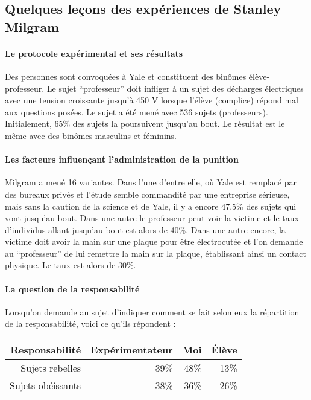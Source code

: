 \subsection{Quelques leçons des expériences de Stanley Milgram}

	\paragraph{Le protocole expérimental et ses résultats}

	Des personnes sont convoquées à Yale et constituent des binômes élève-professeur.
	Le sujet “professeur” doit infliger à un sujet des décharges électriques avec une tension croissante jusqu'à 450 V lorsque l'élève (complice) répond mal aux questions posées.
	Le sujet a été mené avec 536 sujets (professeurs).
	Initialement, 65\% des sujets la poursuivent jusqu'au bout.
	Le résultat est le même avec des binômes masculins et féminins.

	\paragraph{Les facteurs influençant l'administration de la punition}

	Milgram a mené 16 variantes.
	Dans l'une d'entre elle, où Yale est remplacé par des bureaux privés et l'étude semble commandité par une entreprise sérieuse, mais sans la caution de la science et de Yale, il y a encore 47,5\% des sujets qui vont jusqu'au bout.
	Dans une autre le professeur peut voir la victime et le taux d'individus allant jusqu'au bout est alors de 40\%.
	Dans une autre encore, la victime doit avoir la main sur une plaque pour être électrocutée et l'on demande au “professeur” de lui remettre la main sur la plaque, établissant ainsi un contact physique.
	Le taux est alors de 30\%.

	\paragraph{La question de la responsabilité}

	Lorsqu'on demande au sujet d'indiquer comment se fait selon eux la répartition de la responsabilité, voici ce qu'ils répondent :

	\vspace{0.3cm}
	\begin{tabular}{|r|rrr|}
	\hline
	Responsabilité & Expérimentateur & Moi & Élève \\
	\hline
	Sujets rebelles & 39\% & 48\% & 13\% \\
	\hline
	Sujets obéissants & 38\% & 36\% & 26\% \\
	\hline
	\end{tabular}
	\vspace{0.3cm}

